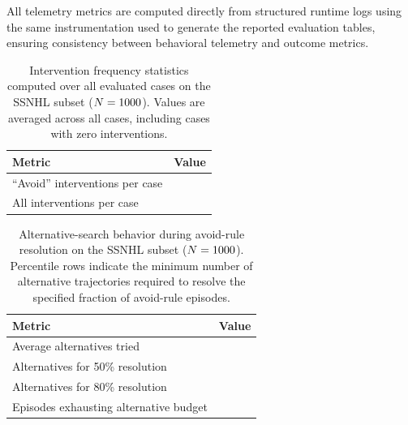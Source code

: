 \documentclass[twocolumn]{article}
\begin{document}
All telemetry metrics are computed directly from structured runtime logs using
the same instrumentation used to generate the reported evaluation tables,
ensuring consistency between behavioral telemetry and outcome metrics.

\begin{table}[!htbp]
  \centering
  \small
  \setlength{\tabcolsep}{4pt}

  \begin{tabular}{lc}
    \toprule
    Metric & Value \\
    \midrule

    ``Avoid'' interventions per case & \RuntimeAvoidInterventionsPerCase{} \\

    All interventions per case & \RuntimeAvgInterventionsPerCase{} \\

    \bottomrule
  \end{tabular}

  \caption{ Intervention frequency statistics computed over all evaluated cases
    on the SSNHL subset ($N=1000$). Values are averaged across all cases,
    including cases with zero interventions. }\label{tab:runtime-interventions}

\end{table}

\begin{table}[!htbp]
  \centering
  \small
  \setlength{\tabcolsep}{4pt}

  \begin{tabular}{lc}
    \toprule
    Metric & Value \\
    \midrule

    Average alternatives tried & \RuntimeAvgAlternativesTried{} \\

    Alternatives for 50\% resolution &
    \RuntimeAlternativesForFiftyPctResolution{} \\

    Alternatives for 80\% resolution &
    \RuntimeAlternativesForEightyPctResolution{} \\

    Episodes exhausting alternative budget & \RuntimeRanOutOfAlternatives{} \\

    \bottomrule
  \end{tabular}

  \caption{ Alternative-search behavior during avoid-rule resolution on the
    SSNHL subset ($N=1000$). Percentile rows indicate the minimum number
    of alternative trajectories required to resolve the specified fraction of
    avoid-rule episodes. }\label{tab:runtime-alternatives}

\end{table}
\end{document}
